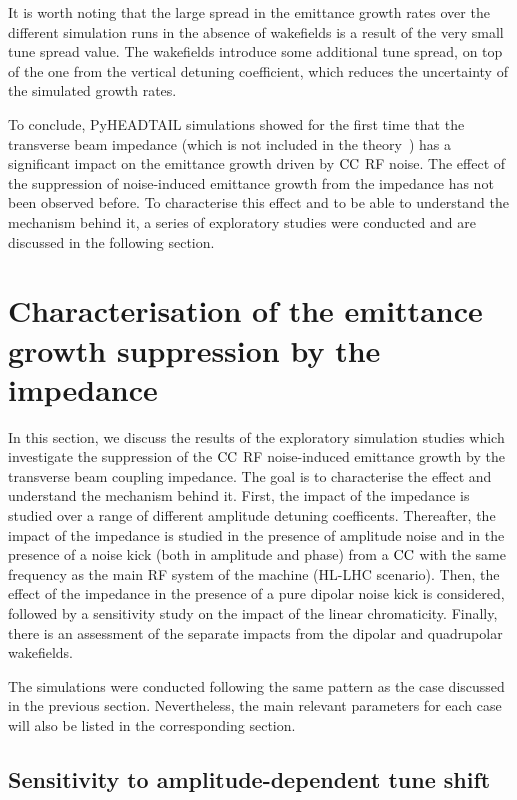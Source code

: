 It is worth noting that the large spread in the emittance growth rates over the different simulation runs in the absence of wakefields is a result of the very small tune spread value. The wakefields introduce some additional tune spread, on top of the one from the vertical detuning coefficient, which reduces the uncertainty of the simulated growth rates.

To conclude, PyHEADTAIL simulations showed for the first time that the transverse beam impedance (which is not included in the theory~\cite{PhysRevSTAB.18.101001}) has a significant impact on the emittance growth driven by ${\mathrm{CC}}$ RF noise. The effect of the suppression of noise-induced emittance growth from the impedance has not been observed before. 
To characterise this effect and to be able to understand the mechanism behind it, a series of exploratory studies were conducted and are discussed in the following section. 


\section{Characterisation of the emittance growth suppression by the impedance}\label{sec:emittance_growth_exploratory_studies}

In this section, we discuss the results of the exploratory simulation studies which investigate the suppression of the ${\mathrm{CC}}$ RF noise-induced emittance growth by the transverse beam coupling impedance. The goal is to characterise the effect and understand the mechanism behind it. First, the impact of the impedance is studied over a range of different amplitude detuning coefficents. Thereafter, the impact of the impedance is studied in the presence of amplitude noise and in the presence of a noise kick (both in amplitude and phase) from a ${\mathrm{CC}}$ with the same frequency as the main RF system of the machine (HL-LHC scenario). Then, the effect of the impedance in the presence of a pure dipolar noise kick is considered, followed by a sensitivity study on the impact of the linear chromaticity. Finally, there is an assessment of the separate impacts from the dipolar and quadrupolar wakefields.

The simulations were conducted following the same pattern as the case discussed in the previous section. Nevertheless, the main relevant parameters for each case will also be listed in the corresponding section.

\subsection{Sensitivity to amplitude-dependent tune shift}\label{subsec:amplitude_detuning_scan}

